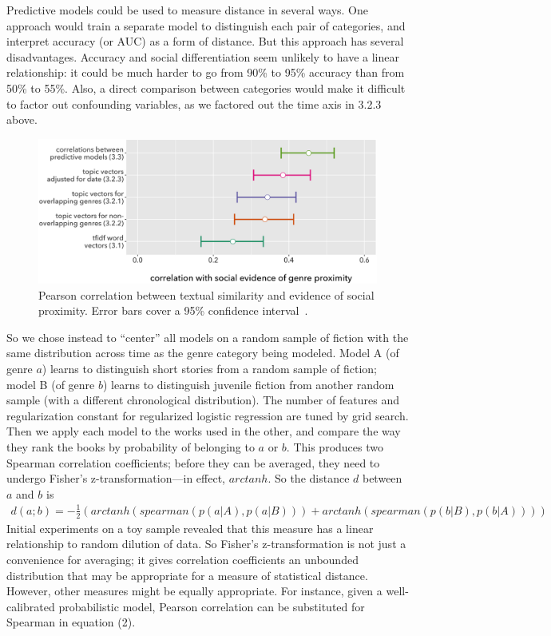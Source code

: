 \documentclass[11pt]{article}
\begin{document}
Predictive models could be used to measure distance in several ways. One approach would train a separate model to distinguish each pair of categories, and interpret accuracy (or AUC) as a form of distance. But this approach has several disadvantages. Accuracy and social differentiation seem unlikely to have a linear relationship: it could be much harder to go from 90\% to 95\% accuracy than from 50\% to 55\%. Also, a direct comparison between categories would make it difficult to factor out confounding variables, as we factored out the time axis in 3.2.3 above.

\begin{figure}
  \includegraphics[width=\textwidth]{fig1boxplots.png}
  \caption{Pearson correlation between textual similarity and evidence of social proximity. Error bars cover a 95\% confidence interval~\cite{zuo:ci,ggplot}.}
  \label{fig:boxplots1}
\end{figure}

So we chose instead to ``center'' all models on a random sample of fiction with the same distribution across time as the genre category being modeled. Model A (of genre $a$) learns to distinguish short stories from a random sample of fiction; model B (of genre $b$) learns to distinguish juvenile fiction from another random sample (with a different chronological distribution). The number of features and regularization constant for regularized logistic regression are tuned by grid search. Then we apply each model to the works used in the other, and compare the way they rank the books by probability of belonging to $a$ or $b$. This produces two Spearman correlation coefficients; before they can be averaged, they need to undergo Fisher's z-transformation---in effect, $arctanh$. So the distance $d$ between $a$ and $b$ is
\begin{multline}
d(a; b) = -\frac{1}{2}(arctanh(spearman(p(a|A), p(a|B))) + arctanh(spearman(p(b|B), p(b|A))))
\end{multline}
Initial experiments on a toy sample revealed that this measure has a linear relationship to random dilution of data. So Fisher's z-transformation is not just a convenience for averaging; it gives correlation coefficients an unbounded distribution that may be appropriate for a measure of statistical distance. However, other measures might be equally appropriate. For instance, given a well-calibrated probabilistic model, Pearson correlation can be substituted for Spearman in equation (2).
\end{document}
